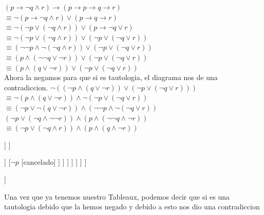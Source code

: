 \documentclass[paper=letter, fontsize=12pt]{scrartcl}
\begin{document}
\begin{center}
$(p\rightarrow \neg q \wedge r) \rightarrow (p\rightarrow p\rightarrow q\rightarrow r)$\\
$\equiv \neg(p\rightarrow \neg q \wedge r)\vee (p\rightarrow q \rightarrow r)$\\
$\equiv \neg (\neg p \vee (\neg q\wedge r))\vee (p\rightarrow \neg q \vee r)$\\
$\equiv \neg (\neg p \vee(\neg q \wedge r))\vee (\neg p \vee (\neg q \vee r))$\\
$\equiv (\neg \neg p \wedge \neg(\neg q \wedge r))\vee (\neg p \vee (\neg q \vee r))$\\
$\equiv (p\wedge(\neg \neg q \vee \neg r))\vee (\neg p \vee (\neg q \vee r))$\\
$\equiv (p\wedge (q \vee \neg r))\vee (\neg p \vee(\neg q \vee r))$\\
Ahora la negamos para que si es tautologia, el diagrama nos de una contradiccion.
$\neg ((\neg p\wedge (q\vee \neg r))\vee (\neg p \vee (\neg q \vee r)))$\\
$\equiv \neg(p\wedge (q\vee \neg r))\wedge \neg(\neg p \vee (\neg q \vee r))$\\
$\equiv (\neg p \vee \neg (q\vee \neg r))\wedge (\neg \neg p \wedge \neg(\neg q \vee r))$\\
$(\neg p \vee (\neg q \wedge \neg \neg r))\wedge(p\wedge (\neg \neg q \wedge \neg r))$\\
$\equiv (\neg p \vee (\neg q \wedge r))\wedge (p\wedge (q\wedge \neg r))$\\
\begin{forest}
[$(\neg p \vee (\neg q \wedge r))\wedge (p\wedge (q\wedge \neg r))$
	[$\neg p\vee(\neg q \wedge r)$
		[$p\wedge(q\wedge \neg r)$
			[$p$
				[$q\wedge \neg r$
					[$q$
						[$\neg r$
							[$\neg q \wedge r$
								[$\neg q$
									[$r$
										[cancelado]
									]
								]
								
							]
							[$\neg p$
								[cancelado]
							]
						]
					]
				]
			]
		]
	]

]
\end{forest}
\end{center}
Una vez que ya tenemos nuestro Tableaux, podemos decir que si es una tautologia debido que la hemos negado y debido a esto nos dio una contradiccion\\
\end{document}
